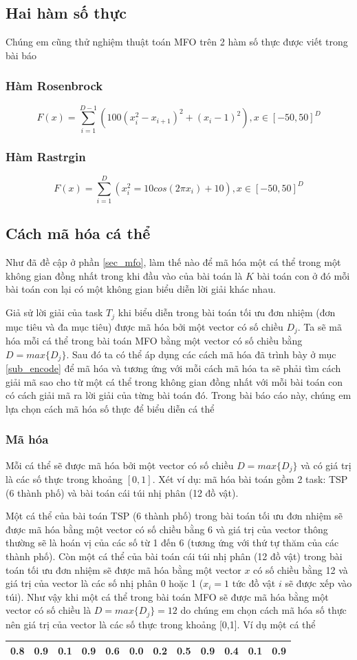 \documentclass[a4paper,12pt]{report}
\begin{document}
\subsection{Hai hàm số thực} 
Chúng em cũng thử nghiệm thuật toán MFO trên 2 hàm số thực được viết trong bài báo \cite{MFO-function}
\subsubsection{Hàm Rosenbrock} 
$$F(x)=\sum_{i=1}^{D-1}(100(x_i^2-x_{i+1})^2+(x_i-1)^2),x \in [-50,50]^D $$
\subsubsection{Hàm Rastrgin}
$$F(x)=\sum_{i=1}^D(x_i^2=10cos(2\pi x_i)+10),x \in [-50,50]^D$$

\subsection{Cách mã hóa cá thể}
Như đã đề cập ở phần \ref{sec_mfo}, làm thế nào để mã hóa một cá thể trong một không gian đồng nhất trong khi đầu vào của bài toán là $K$ bài toán con ở đó mỗi bài toán con lại có một không gian biểu diễn lời giải khác nhau.
\par Giả sử lời giải của task $T_j$ khi biểu diễn trong bài toán tối ưu đơn nhiệm (đơn mục tiêu và đa mục tiêu) được mã hóa bởi một vector có số chiều $D_j$. Ta sẽ mã hóa mỗi cá thể trong bài toán MFO bằng một vector có số chiều bằng $D = max\{D_j\}$. Sau đó ta có thể áp dụng các cách mã hóa đã trình bày ở mục \ref{sub_encode}  để mã hóa và tương ứng với mỗi cách mã hóa ta sẽ phải tìm cách giải mã sao cho từ một cá thể trong không gian đồng nhất với mỗi bài toán con có cách giải mã ra lời giải của từng bài toán đó. Trong bài báo cáo này, chúng em lựa chọn cách mã hóa số thực để biểu diễn cá thể
\subsubsection{Mã hóa}
Mỗi cá thể sẽ được mã hóa bởi một vector có số chiều $D = max\{D_j\}$ và có giá trị là các số thực trong khoảng $[0,1]$. Xét ví dụ: mã hóa bài toán gồm 2 task: TSP (6 thành phố) và bài toán cái túi nhị phân (12 đồ vật).
\par Một cá thể của bài toán TSP (6 thành phố) trong bài toán tối ưu đơn nhiệm sẽ được mã hóa bằng một vector có số chiều bằng 6 và giá trị của vector thông thường sẽ là hoán vị của các số từ 1 đến 6 (tương ứng với thứ tự thăm của các thành phố). Còn một cá thể của bài toán cái túi nhị phân (12 đồ vật) trong bài toán tối ưu đơn nhiệm sẽ được mã hóa bằng một vector $x$ có số chiều bằng 12 và giá trị của vector là các số nhị phân 0 hoặc 1 ($x_i=1$ tức đồ vật $i$ sẽ được xếp vào túi). Như vậy khi một cá thể trong bài toán MFO sẽ được mã hóa bằng một vector có số chiều là $D = max\{D_j\} = 12$ do chúng em chọn cách mã hóa số thực nên giá trị của vector là các số thực trong khoảng [0,1]. Ví dụ một cá thể \cite{MFO-slide}
\begin{longtable}{|c|c|c|c|c|c|c|c|c|c|c|c|}
\hline
0.8 & 0.9 & 0.1 & 0.9 & 0.6 & 0.0 & 0.2 & 0.5 & 0.9 & 0.4 & 0.1 & 0.9\\
\hline
\end{longtable}
\end{document}
